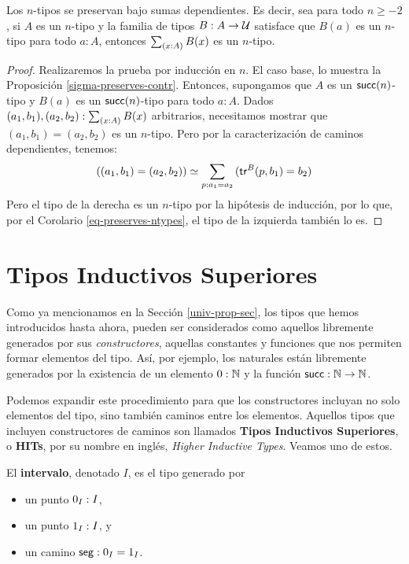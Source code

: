 \documentclass[../main.tex]{subfiles}
\begin{document}
\begin{proposition}
  Los $n$-tipos se preservan bajo sumas dependientes. Es decir, sea para todo $n \geq -2$, si $A$ es un $n$-tipo y la familia de tipos $B: A \to \mathcal{U}$ satisface que $B(a)$ es un $n$-tipo para todo $a:A$, entonces $\tsm{x:A}B(x)$ es un $n$-tipo.
\end{proposition}
\begin{proof}
  Realizaremos la prueba por inducción en $n$.
  El caso base, lo muestra la Proposici\'on \ref{sigma-preserves-contr}.
  Entonces, supongamos que $A$ es un $\mathsf{succ}(n)$-tipo y $B(a)$ es un $\mathsf{succ}(n)$-tipo para todo $a:A$.
  Dados $(a_1,b_1),(a_2,b_2):\tsm{x:A}B(x)$ arbitrarios, necesitamos mostrar que $(a_1,b_1)=(a_2,b_2)$ es un $n$-tipo. Pero por la caracterizaci\'on de caminos dependientes, tenemos:
  \[ \eqv{((a_1,b_1)=(a_2,b_2))}{\sm{p:a_1=a_2}(\trfib{B}{p}{b_1} = b_2)} \]
  Pero el tipo de la derecha es un $n$-tipo por la hip\'otesis de inducci\'on, por lo que, por el Corolario \ref{eq-preserves-ntypes}, el tipo de la izquierda tambi\'en lo es.
\end{proof}


\section{Tipos Inductivos Superiores}\label{HITs-sec}
Como ya mencionamos en la Secci\'on \ref{univ-prop-sec}, los tipos que hemos introducidos hasta ahora, pueden ser considerados como aquellos libremente generados por sus \textit{constructores}, aquellas constantes y funciones que nos permiten formar elementos del tipo.
As\'i, por ejemplo, los naturales est\'an libremente generados por la existencia de un elemento $0 : \mathbb{N}$ y la funci\'on $\mathsf{succ} : \mathbb{N} \to \mathbb{N}$.

Podemos expandir este procedimiento para que los constructores incluyan no solo elementos del tipo, sino tambi\'en caminos entre los elementos.
Aquellos tipos que incluyen constructores de caminos son llamados \textbf{Tipos Inductivos Superiores}, o \textbf{HITs}, por su nombre en ingl\'es, \textit{Higher Inductive Types}.
Veamos uno de estos.

\begin{definition}
  El \textbf{intervalo}, denotado $I$, es el tipo generado por
  \begin{itemize}
    \item un punto $0_{I} : I$,
    \item un punto $1_{I} : I$, y
    \item un camino $\mathsf{seg} : 0_{I} = 1_{I}$.
  \end{itemize}
\end{definition}
\end{document}
